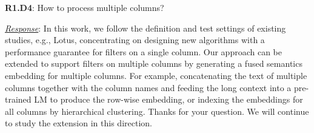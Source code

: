 \documentclass[sigconf]{acmart}
\begin{document}



{\noindent \textbf{R1.D4}}: How to process multiple columns?

{\noindent \underline{\sl Response}:}
In this work, we follow the definition and test settings of existing studies, e.g., Lotus, concentrating on designing new algorithms with a performance guarantee for filters on a single column.
Our approach can be extended to support filters on multiple columns by generating a fused semantics embedding for multiple columns. 
For example, concatenating the text of multiple columns together with the column names and feeding the long context into a pre-trained LM to produce the row-wise embedding, or indexing the embeddings for all columns by hierarchical clustering. Thanks for your question. We will continue to study the extension in this direction.

\end{document}
